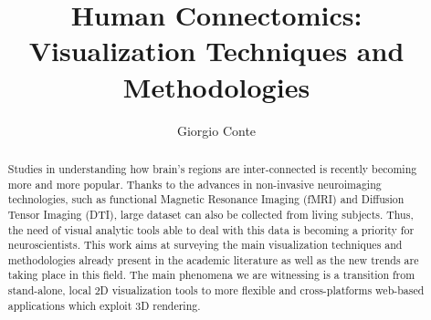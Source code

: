 \documentclass{article}
\title{Human Connectomics: Visualization Techniques and Methodologies}
\author{Giorgio Conte}
\affil{Creative Coding Research Group\\ Department of Computer Science\\University of Illinois at Chicago}
\begin{document}
\maketitle
\begin{abstract}
Studies in understanding how brain's regions are inter-connected is recently becoming more and more popular. Thanks to the advances in non-invasive neuroimaging technologies, such as functional Magnetic Resonance Imaging (fMRI) and Diffusion Tensor Imaging (DTI), large dataset can also be collected from living subjects. Thus, the need of visual analytic tools able to deal with this data is becoming a priority for neuroscientists. This work aims at surveying the main visualization techniques and methodologies already present in the academic literature as well as the new trends are taking place in this field. The main phenomena we are witnessing is a transition from stand-alone, local 2D visualization tools to more flexible and cross-platforms web-based applications which exploit 3D rendering.
\end{abstract}
\end{document}
